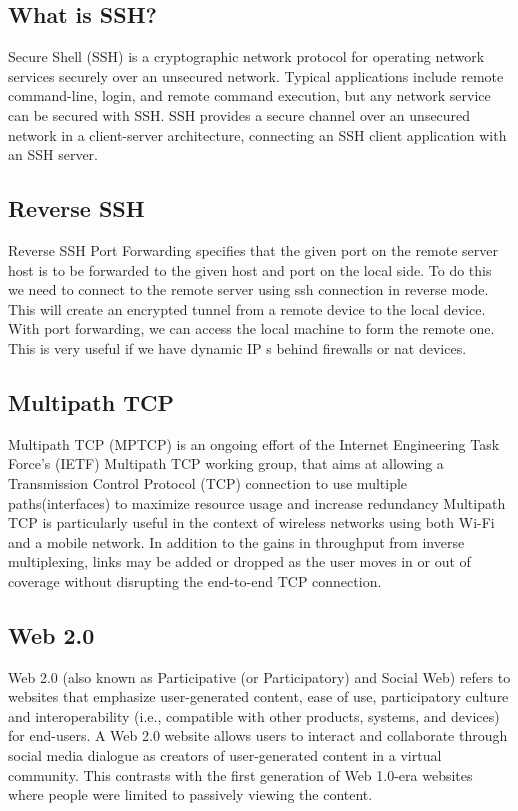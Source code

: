 \subsection{What is SSH?}
\vspace{12pt}
Secure Shell (SSH) is a cryptographic network protocol for operating network services securely over an unsecured network. Typical applications include remote command-line, login, and remote command execution, but any network service can be secured with SSH. SSH provides a secure channel over an unsecured network in a client-server architecture, connecting an SSH client application with an SSH server.\cite{ssh}

\subsection{Reverse SSH}
\vspace{12pt}					
Reverse SSH Port Forwarding specifies that the given port on the remote server host is to be forwarded to the given host and port on the local side. To do this we need to connect to the remote server using ssh connection in reverse mode. This will create an encrypted tunnel from a remote device to the local device. With port forwarding, we can access the local machine to form the remote one. This is very useful if we have dynamic IP s behind firewalls or nat devices.

\vspace{12pt}
\subsection{Multipath TCP}
\vspace{12pt}
Multipath TCP (MPTCP) is an ongoing effort of the Internet  Engineering Task Force's (IETF) Multipath TCP working group, that aims at allowing a Transmission Control Protocol (TCP) connection to use multiple paths(interfaces) to maximize resource usage and increase redundancy\cite{mptcp}
\vspace{12pt}
Multipath TCP is particularly useful in the context of wireless networks using both Wi-Fi and a mobile network. In addition to the gains in throughput from inverse multiplexing, links may be added or dropped as the user moves in or out of coverage without disrupting the end-to-end TCP connection.
\vspace{12pt}

\subsection{Web 2.0}
\vspace{12pt}
Web 2.0 (also known as Participative (or Participatory) and Social Web) refers to websites that emphasize user-generated content, ease of use, participatory culture and interoperability (i.e., compatible with other products, systems, and devices) for end-users.
\vspace{12pt}
A Web 2.0 website allows users to interact and collaborate through social media dialogue as creators of user-generated content in a virtual community. This contrasts with the first generation of Web 1.0-era websites where people were limited to passively viewing the content. 

